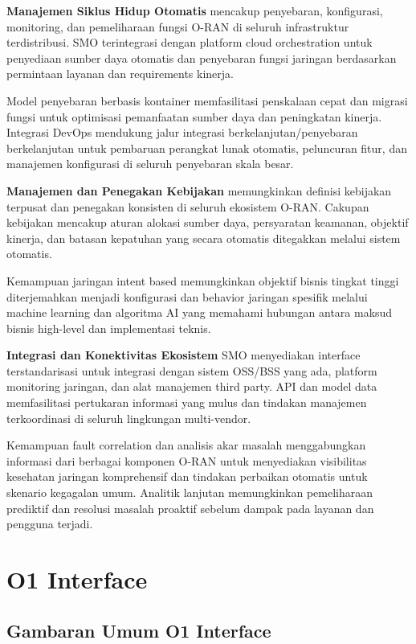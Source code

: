 \textbf{Manajemen Siklus Hidup Otomatis} mencakup penyebaran, konfigurasi, monitoring, dan pemeliharaan fungsi O-RAN di seluruh infrastruktur terdistribusi. SMO terintegrasi dengan platform cloud orchestration untuk penyediaan sumber daya otomatis dan penyebaran fungsi jaringan berdasarkan permintaan layanan dan requirements kinerja.

Model penyebaran berbasis kontainer memfasilitasi penskalaan cepat dan migrasi fungsi untuk optimisasi pemanfaatan sumber daya dan peningkatan kinerja. Integrasi DevOps mendukung jalur integrasi berkelanjutan/penyebaran berkelanjutan untuk pembaruan perangkat lunak otomatis, peluncuran fitur, dan manajemen konfigurasi di seluruh penyebaran skala besar.

\textbf{Manajemen dan Penegakan Kebijakan} memungkinkan definisi kebijakan terpusat dan penegakan konsisten di seluruh ekosistem O-RAN. Cakupan kebijakan mencakup aturan alokasi sumber daya, persyaratan keamanan, objektif kinerja, dan batasan kepatuhan yang secara otomatis ditegakkan melalui sistem otomatis.

Kemampuan jaringan intent based memungkinkan objektif bisnis tingkat tinggi diterjemahkan menjadi konfigurasi dan behavior jaringan spesifik melalui machine learning dan algoritma AI yang memahami hubungan antara maksud bisnis high-level dan implementasi teknis.

\textbf{Integrasi dan Konektivitas Ekosistem} SMO menyediakan interface terstandarisasi untuk integrasi dengan sistem OSS/BSS yang ada, platform monitoring jaringan, dan alat manajemen third party. API dan model data memfasilitasi pertukaran informasi yang mulus dan tindakan manajemen terkoordinasi di seluruh lingkungan multi-vendor.

Kemampuan fault correlation dan analisis akar masalah menggabungkan informasi dari berbagai komponen O-RAN untuk menyediakan visibilitas kesehatan jaringan komprehensif dan tindakan perbaikan otomatis untuk skenario kegagalan umum. Analitik lanjutan memungkinkan pemeliharaan prediktif dan resolusi masalah proaktif sebelum dampak pada layanan dan pengguna terjadi.

\section{O1 Interface} 

\subsection{Gambaran Umum O1 Interface}

